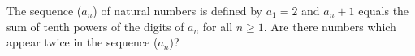 The sequence ($a_n$) of natural numbers is defined by $a_1 = 2$ and $a_n+1$ equals the sum of tenth powers of the digits of $a_n$ for all $n \ge 1$. Are there numbers which appear twice in the sequence ($a_n$)?